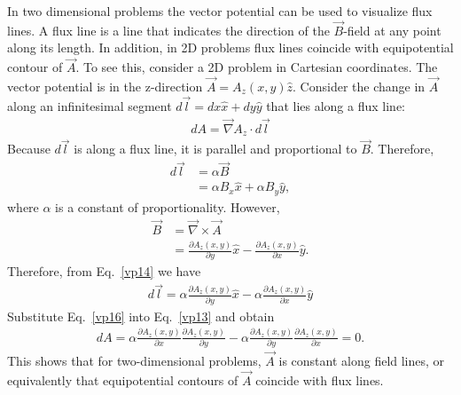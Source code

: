 \documentclass[11pt,a4paper,oneside]{book}
\numberwithin{equation}{section}
\theoremstyle{it}
\theoremstyle{definition}
\begin{document}
In two dimensional problems the vector potential can be used to visualize flux lines. A flux line is a line that indicates the direction of the $\vec{B}$-field at any point along its length. In addition, in 2D problems flux lines coincide with equipotential contour of $\vec{A}$. To see this, consider a 2D problem in Cartesian coordinates. The vector potential is in the z-direction $\vec{A}=A_z(x,y)\hat{z}$. Consider the change in $\vec{A}$ along an infinitesimal segment $d\vec{l}=dx\hat{x}+dy\hat{y}$ that lies along a flux line:
\begin{equation}\label{vp13}
	\begin{aligned}
		dA = \vec{\nabla}A_z\cdot d\vec{l}
	\end{aligned}
\end{equation}
Because $d\vec{l}$ is along a flux line, it is parallel and proportional to $\vec{B}$. Therefore,
\begin{equation}\label{vp14}
	\begin{aligned}
		d\vec{l} &=\alpha\vec{B} \\[6pt]
		&=\alpha B_x \hat{x} + \alpha B_y \hat{y},
	\end{aligned}
\end{equation}
where $\alpha$ is a constant of proportionality. However, 
\begin{equation}\label{vp15}
	\begin{aligned}
		\vec{B} &= \vec{\nabla}\times\vec{A} \\[6pt]
		&= \frac{\partial A_z(x,y)}{\partial y} \hat{x} - \frac{\partial A_z(x,y)}{\partial x}\hat{y}.
	\end{aligned}
\end{equation}
Therefore, from Eq.~\eqref{vp14} we have
\begin{equation}\label{vp16}
	\begin{aligned}
		d\vec{l} = \alpha\frac{\partial A_z(x,y)}{\partial y}\hat{x}-\alpha\frac{\partial A_z(x,y)}{\partial x}\hat{y}
	\end{aligned}
\end{equation}
Substitute Eq.~\eqref{vp16} into Eq.~\eqref{vp13} and obtain 
\begin{equation}\label{vp17}
	\begin{aligned}
dA = \alpha \frac{\partial A_z(x,y)}{\partial x}\frac{\partial A_z(x,y)}{\partial y} - \alpha \frac{\partial A_z(x,y)}{\partial y}\frac{\partial A_z(x,y)}{\partial x} = 0.
	\end{aligned}
\end{equation}
This shows that for two-dimensional problems, $\vec{A}$ is constant along field lines, or equivalently that equipotential contours of $\vec{A}$ coincide with flux lines.
\end{document}
